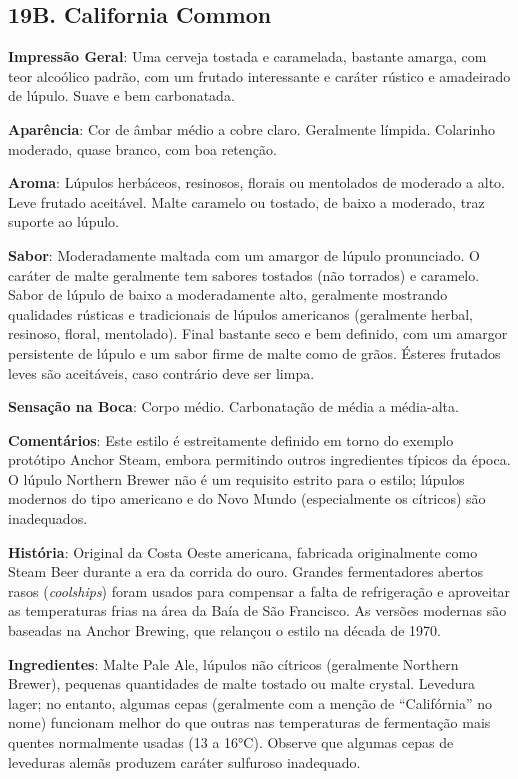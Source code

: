 \subsection*{19B. California Common}
\textbf{Impressão Geral}: Uma cerveja tostada e caramelada, bastante amarga, com teor alcoólico padrão, com um frutado interessante e caráter rústico e amadeirado de lúpulo. Suave e bem carbonatada.

\textbf{Aparência}: Cor de âmbar médio a cobre claro. Geralmente límpida. Colarinho moderado, quase branco, com boa retenção.

\textbf{Aroma}: Lúpulos herbáceos, resinosos, florais ou mentolados de moderado a alto. Leve frutado aceitável. Malte caramelo ou tostado, de baixo a moderado, traz suporte ao lúpulo.

\textbf{Sabor}: Moderadamente maltada com um amargor de lúpulo pronunciado. O caráter de malte geralmente tem sabores tostados (não torrados) e caramelo. Sabor de lúpulo de baixo a moderadamente alto, geralmente mostrando qualidades rústicas e tradicionais de lúpulos americanos (geralmente herbal, resinoso, floral, mentolado). Final bastante seco e bem definido, com um amargor persistente de lúpulo e um sabor firme de malte como de grãos. Ésteres frutados leves são aceitáveis, caso contrário deve ser limpa.

\textbf{Sensação na Boca}: Corpo médio. Carbonatação de média a média-alta.

\textbf{Comentários}: Este estilo é estreitamente definido em torno do exemplo protótipo Anchor Steam, embora permitindo outros ingredientes típicos da época. O lúpulo Northern Brewer não é um requisito estrito para o estilo; lúpulos modernos do tipo americano e do Novo Mundo (especialmente os cítricos) são inadequados.

\textbf{História}: Original da Costa Oeste americana, fabricada originalmente como Steam Beer durante a era da corrida do ouro. Grandes fermentadores abertos rasos (\textit{coolships}) foram usados para compensar a falta de refrigeração e aproveitar as temperaturas frias na área da Baía de São Francisco. As versões modernas são baseadas na Anchor Brewing, que relançou o estilo na década de 1970.

\textbf{Ingredientes}: Malte Pale Ale, lúpulos não cítricos (geralmente Northern Brewer), pequenas quantidades de malte tostado ou malte crystal. Levedura lager; no entanto, algumas cepas (geralmente com a menção de “Califórnia” no nome) funcionam melhor do que outras nas temperaturas de fermentação mais quentes normalmente usadas (13 a 16°C). Observe que algumas cepas de leveduras alemãs produzem caráter sulfuroso inadequado.

